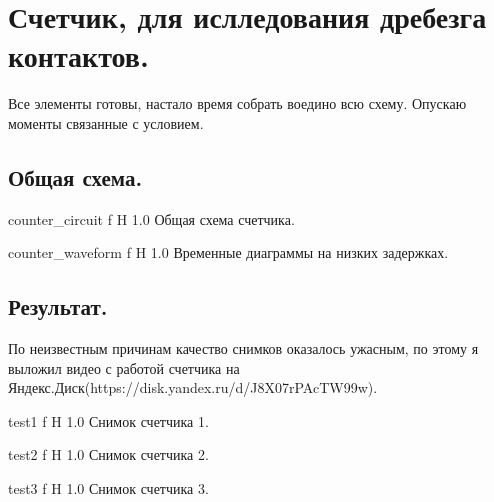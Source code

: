\documentclass{bmstu}
\begin{document}
	\chapter{Счетчик, для ислледования дребезга контактов.}

	\begin{flushleft}
		Все элементы готовы, настало время собрать воедино всю схему. Опускаю моменты связанные с условием.
	\end{flushleft}
	
	\section{Общая схема.}

	{counter_circuit}
	{f} %
	{H} %
	{1.0\textwidth} %
	{Общая схема счетчика.} %
	
	{counter_waveform}
	{f} %
	{H} %
	{1.0\textwidth} %
	{Временные диаграммы на низких задержках.} %

	\section{Результат.}

	\begin{flushleft}
		По неизвестным причинам качество снимков оказалось ужасным, 
		по этому я выложил видео с работой счетчика на Яндекс.Диск(https://disk.yandex.ru/d/J8X07rPAcTW99w).
	\end{flushleft}
	
	{test1}
	{f} %
	{H} %
	{1.0\textwidth} %
	{Снимок счетчика 1.} %
	
	{test2}
	{f} %
	{H} %
	{1.0\textwidth} %
	{Снимок счетчика 2.} %
	
	{test3}
	{f} %
	{H} %
	{1.0\textwidth} %
	{Снимок счетчика 3.} %
	
\end{document}
